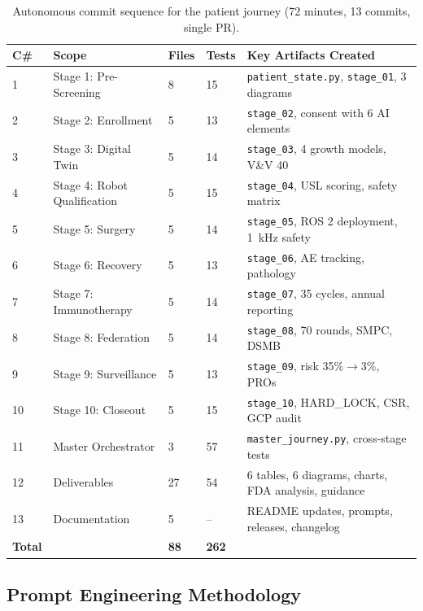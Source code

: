 \documentclass{article}
\begin{document}
\begin{table}[H]
\centering
\caption{Autonomous commit sequence for the patient journey (72 minutes, 13 commits, single PR).}
\label{tab:commit-structure}
\scriptsize
\begin{tabularx}{\textwidth}{@{}C{0.6cm}L{4.0cm}R{1.0cm}R{1.0cm}L{5.0cm}@{}}
\toprule
\textbf{C\#} & \textbf{Scope} & \textbf{Files} & \textbf{Tests} & \textbf{Key Artifacts Created} \\
 & Stage 1: Pre-Screening & 8 & 15 & \texttt{patient\_state.py}, \texttt{stage\_01}, 3 diagrams \\
2 & Stage 2: Enrollment & 5 & 13 & \texttt{stage\_02}, consent with 6 AI elements \\
3 & Stage 3: Digital Twin & 5 & 14 & \texttt{stage\_03}, 4 growth models, V\&V 40 \\
4 & Stage 4: Robot Qualification & 5 & 15 & \texttt{stage\_04}, USL scoring, safety matrix \\
5 & Stage 5: Surgery & 5 & 14 & \texttt{stage\_05}, ROS 2 deployment, 1~kHz safety \\
6 & Stage 6: Recovery & 5 & 13 & \texttt{stage\_06}, AE tracking, pathology \\
7 & Stage 7: Immunotherapy & 5 & 14 & \texttt{stage\_07}, 35 cycles, annual reporting \\
8 & Stage 8: Federation & 5 & 14 & \texttt{stage\_08}, 70 rounds, SMPC, DSMB \\
9 & Stage 9: Surveillance & 5 & 13 & \texttt{stage\_09}, risk 35\%$\rightarrow$3\%, PROs \\
10 & Stage 10: Closeout & 5 & 15 & \texttt{stage\_10}, HARD\_LOCK, CSR, GCP audit \\
11 & Master Orchestrator & 3 & 57 & \texttt{master\_journey.py}, cross-stage tests \\
12 & Deliverables & 27 & 54 & 6 tables, 6 diagrams, charts, FDA analysis, guidance \\
13 & Documentation & 5 & -- & README updates, prompts, releases, changelog \\
\midrule
\textbf{Total} & & \textbf{88} & \textbf{262} & \\
\bottomrule
\end{tabularx}
\end{table}

\subsection{Prompt Engineering Methodology}
\end{document}
